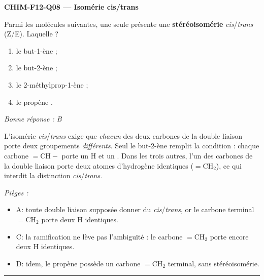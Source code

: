 \documentclass[11pt,a4paper]{article}
\begin{document}
\noindent\textbf{CHIM-F12-Q08 --- Isomérie cis/trans}\par
Parmi les molécules suivantes, une seule présente une \textbf{stéréoisomérie} \emph{cis}/\emph{trans} (Z/E). Laquelle ?
\begin{enumerate}[label=\Alph*)]
\item le but-1-ène  ;
\item le but-2-ène  ;
\item le 2-méthylprop-1-ène  ;
\item le propène .
\end{enumerate}
\textit{Bonne réponse : B}\par
L'isomérie \emph{cis}/\emph{trans} exige que \emph{chacun} des deux carbones de la double liaison porte deux groupements \emph{différents}. Seul le but-2-ène remplit la condition : chaque carbone $=\text{CH}-$ porte un $\text{H}$ et un . Dans les trois autres, l'un des carbones de la double liaison porte deux atomes d'hydrogène identiques ($=\text{CH}_2$), ce qui interdit la distinction \emph{cis}/\emph{trans}.\par
\textit{Pièges :}
\begin{itemize}
\item A: toute double liaison supposée donner du \emph{cis}/\emph{trans}, or le carbone terminal $=\text{CH}_2$ porte deux H identiques.
\item C: la ramification ne lève pas l'ambiguïté : le carbone $=\text{CH}_2$ porte encore deux H identiques.
\item D: idem, le propène possède un carbone $=\text{CH}_2$ terminal, sans stéréoisomérie.
\end{itemize}
\vspace{8pt}\hrule\vspace{8pt}
\end{document}
